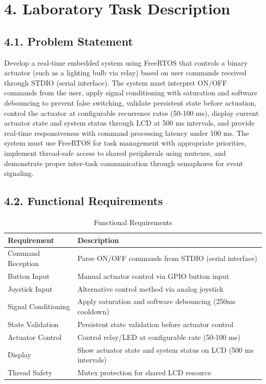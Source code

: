 \documentclass[12pt]{article}
\begin{document}
\section*{4. Laboratory Task Description}

\subsection*{4.1. Problem Statement}

Develop a real-time embedded system using FreeRTOS that controls a binary actuator (such as a lighting bulb via relay) based on user commands received through STDIO (serial interface). The system must interpret ON/OFF commands from the user, apply signal conditioning with saturation and software debouncing to prevent false switching, validate persistent state before actuation, control the actuator at configurable recurrence rates (50-100 ms), display current actuator state and system status through LCD at 500 ms intervals, and provide real-time responsiveness with command processing latency under 100 ms. The system must use FreeRTOS for task management with appropriate priorities, implement thread-safe access to shared peripherals using mutexes, and demonstrate proper inter-task communication through semaphores for event signaling.

\subsection*{4.2. Functional Requirements}

\begin{table}[H]
	\centering
	\caption{Functional Requirements}
	\label{tab:functional-requirements}
	\begin{tabular}{|l|l|}
		\hline
		\textbf{Requirement} & \textbf{Description} \\
		\hline
		Command Reception & Parse ON/OFF commands from STDIO (serial interface) \\
		\hline
		Button Input & Manual actuator control via GPIO button input \\
		\hline
		Joystick Input & Alternative control method via analog joystick \\
		\hline
		Signal Conditioning & Apply saturation and software debouncing (250ms cooldown) \\
		\hline
		State Validation & Persistent state validation before actuator control \\
		\hline
		Actuator Control & Control relay/LED at configurable rate (50-100 ms) \\
		\hline
		Display & Show actuator state and system status on LCD (500 ms intervals) \\
		\hline
		Thread Safety & Mutex protection for shared LCD resource \\
		\hline
	\end{tabular}
\end{table}
\end{document}
